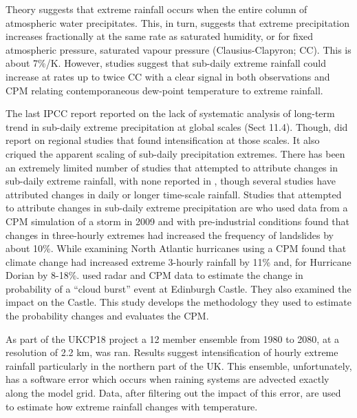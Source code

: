 \documentclass[11pt,a4paper]{article}
\begin{document}
Theory\parencite{allen02insight} suggests that extreme rainfall occurs when the entire column of atmospheric water precipitates. This, in turn,  suggests that extreme precipitation increases fractionally at the same rate as saturated humidity, or for fixed atmospheric pressure, saturated vapour pressure (Clausius-Clapyron; CC). This is about 7\%/K. However,  studies suggest that sub-daily extreme rainfall  could increase  at rates  up to twice CC\parencite{fowler2021rainfall_extremes} with a clear signal in both observations and CPM relating contemporaneous dew-point temperature to extreme rainfall. 

The last IPCC report\parencite{Seneviratne2021ippcc_chapter_extremes} reported on the lack of systematic analysis of long-term trend in sub-daily extreme precipitation at global scales (Sect 11.4). Though, did report on regional studies that found intensification at those scales. It also criqued the apparent scaling of sub-daily precipitation extremes. There has  been an extremely limited number of studies that attempted to attribute changes in sub-daily extreme rainfall, with none reported in \cite{Seneviratne2021ippcc_chapter_extremes},  though several studies have attributed changes in daily or longer time-scale rainfall\parencite{clarke2022extreme_Attribution,Zhang2020rainfall,tradowsky2023w_europe_rain}.  Studies that attempted to attribute changes in sub-daily extreme precipitation are \cite{mishra2023landslide} who used  data from a CPM simulation of a storm in 2009 and with pre-industrial conditions found that changes in three-hourly extremes had increased the frequency of landslides by about 10\%. While \cite{Reed2022,Reed2021dorian_extreme_rain} examining North Atlantic hurricanes  using a CPM found that climate change had increased extreme 3-hourly rainfall by 11\% and, for Hurricane Dorian by 8-18\%. \cite{tett2023edinburgh} used radar and CPM data to estimate the change in probability of a ``cloud burst'' event at Edinburgh Castle. They also examined the impact on the Castle.  This study develops the methodology they used to estimate the probability changes and evaluates the CPM. 

  As part of the UKCP18 project\parencite{kendon2023uk_cpm} a 12 member ensemble from 1980 to 2080, at a resolution of 2.2 km, was ran. Results suggest intensification of hourly extreme rainfall particularly in the northern part of the UK.  This ensemble, unfortunately, has a software error which occurs when raining systems are advected exactly along the model grid.  Data, after filtering out the impact of this error, are used to estimate how extreme rainfall changes with temperature. 
 
\end{document}
